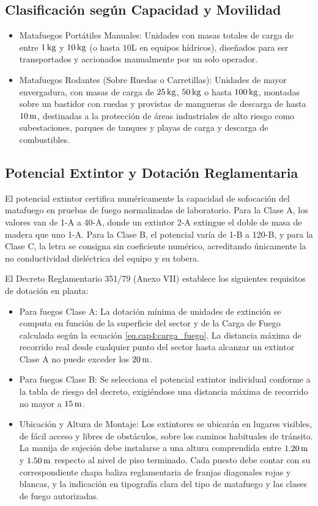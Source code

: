 \subsection{Clasificación según Capacidad y Movilidad}

\begin{itemize}
    \item Matafuegos Portátiles Manuales: Unidades con masas totales de carga de entre $1\,\mathrm{kg}$ y $10\,\mathrm{kg}$ (o hasta
          $10\unit{\liter}$ en equipos hídricos), diseñados para ser transportados y accionados manualmente por un solo
          operador.
    \item Matafuegos Rodantes (Sobre Ruedas o Carretillas): Unidades de mayor envergadura, con masas de carga de $25\,\mathrm{kg}$,
          $50\,\mathrm{kg}$ o hasta $100\,\mathrm{kg}$, montadas sobre un bastidor con ruedas y provistas de mangueras de descarga de hasta
          $10\,\mathrm{m}$, destinadas a la protección de áreas industriales de alto riesgo como subestaciones, parques de tanques y
          playas de carga y descarga de combustibles.
\end{itemize}

\subsection{Potencial Extintor y Dotación Reglamentaria}

El potencial extintor certifica numéricamente la capacidad de sofocación del matafuego en pruebas de
fuego normalizadas de laboratorio. Para la Clase A, los valores van de 1-A a 40-A, donde un extintor 2-A extingue el
doble de masa de madera que uno 1-A. Para la Clase B, el potencial varía de 1-B a 120-B, y para la Clase C, la letra se
consigna sin coeficiente numérico, acreditando únicamente la no conductividad dieléctrica del equipo y su tobera.

El Decreto Reglamentario 351/79 (Anexo VII) establece los siguientes requisitos de dotación en planta:
\begin{itemize}
    \item Para fuegos Clase A: La dotación mínima de unidades de extinción se computa en función de la superficie del
          sector y de la Carga de Fuego calculada según la ecuación \ref{eq.cap4:carga_fuego}. La distancia máxima de
          recorrido real desde cualquier punto del sector hasta alcanzar un extintor Clase A no puede exceder los $20\,\mathrm{m}$.
    \item Para fuegos Clase B: Se selecciona el potencial extintor individual conforme a la tabla de riesgo del decreto,
          exigiéndose una distancia máxima de recorrido no mayor a $15\,\mathrm{m}$.
    \item Ubicación y Altura de Montaje: Los extintores se ubicarán en lugares visibles, de fácil acceso y libres de
          obstáculos, sobre los caminos habituales de tránsito. La manija de sujeción debe instalarse a una altura
          comprendida entre $1.20\,\mathrm{m}$ y $1.50\,\mathrm{m}$ respecto al nivel de piso terminado. Cada puesto debe contar con su
          correspondiente chapa baliza reglamentaria de franjas diagonales rojas y blancas, y la indicación en tipografía
          clara del tipo de matafuego y las clases de fuego autorizadas.
\end{itemize}

